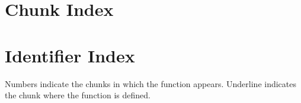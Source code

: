 \documentclass[a4paper]{article}
\begin{document}
\section{Chunk Index}
\label{sec:chunk-index}
\nowebchunks

\section{Identifier Index}
\label{sec:identifier-index}
Numbers indicate the chunks in which the function appears.
Underline indicates the chunk where the function is defined.
\medskip

\nowebindex

\nocite{*}

\end{document}
